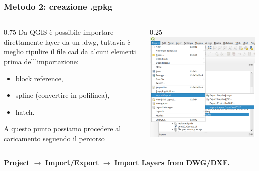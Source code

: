 \documentclass{beamer}
\begin{document}
{\begin{frame}
  \frametitle{Metodo 2: creazione .gpkg}
  \begin{columns}
		\begin{column} {0.75\textwidth}	
			Da QGIS è possibile importare direttamente layer da un .dwg, tuttavia è meglio ripulire il file cad da alcuni elementi prima dell'importazione: 
        \begin{itemize}
   		\item block reference,
   		\item spline (convertire in polilinea),
   		\item hatch.
   	\end{itemize}
  		A questo punto possiamo procedere al caricamento seguendo il percorso 				
		\end{column}
		\begin{column} {0.25\textwidth}	
			\includegraphics[width=1\textwidth] {./pics/project.png}	
		\end{column}
	\end{columns}
   
  \begin{center}
  		\textbf{Project} $\rightarrow$ \textbf{Import/Export} $\rightarrow$ \textbf{Import Layers from DWG/DXF.}
  \end{center}    
\end{frame} 

}
\end{document}
